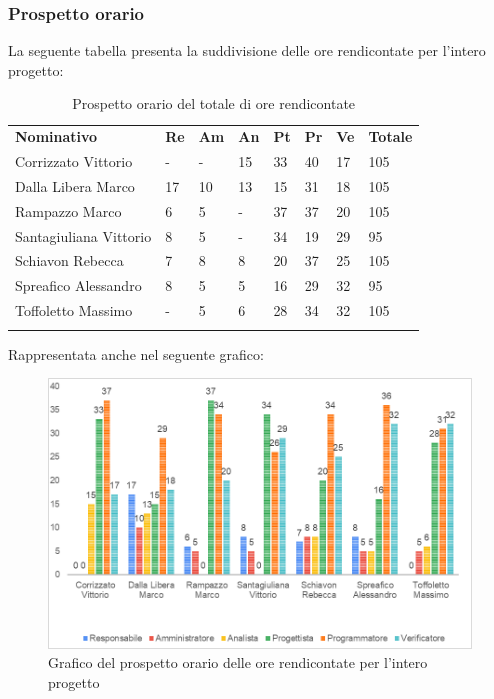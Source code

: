\subsubsection{Prospetto orario}
La seguente tabella presenta la suddivisione delle ore rendicontate per l'intero progetto\glo:
\begin{longtable} {				
		>{}p{40mm}  
		>{}p{8mm}
		>{}p{8mm}
		>{}p{8mm}
		>{}p{8mm}
		>{}p{8mm}
		>{}p{8mm}
		>{}p{12mm}			
	}			
	\rowcolor{gray!50}
	\textbf{Nominativo} & \textbf{Re} & \textbf{Am} & \textbf{An} & \textbf{Pt} & \textbf{Pr} & \textbf{Ve} & \textbf{Totale}	\TBstrut \\ [2mm]
	Corrizzato Vittorio & - & - & 15 & 33 & 40 & 17 & 105 \TBstrut \\ [2mm]
	Dalla Libera Marco & 17 & 10 & 13 & 15 & 31 & 18 & 105 \TBstrut \\ [2mm]
	Rampazzo Marco & 6 & 5 & - & 37 & 37 & 20 & 105 \TBstrut \\ [2mm]
	Santagiuliana Vittorio & 8 & 5 & - & 34 & 19 & 29 & 95 \TBstrut \\ [2mm]
	Schiavon Rebecca & 7 & 8 & 8 & 20 & 37 & 25 & 105 \TBstrut \\ [2mm]
	Spreafico Alessandro & 8 & 5 & 5 & 16 & 29 & 32 & 95 \TBstrut \\ [2mm]
	Toffoletto Massimo & - & 5 & 6 & 28 & 34 & 32 & 105 \TBstrut \\ [2mm]
	\rowcolor{white}
	\caption{Prospetto orario del totale di ore rendicontate}
\end{longtable}
Rappresentata anche nel seguente grafico:
\begin{figure} [H]
	\includegraphics[width=\linewidth]{./img/Grafici/11.png}
	\caption{Grafico del prospetto orario delle ore rendicontate per l'intero progetto\glo}
\end{figure}
\pagebreak
